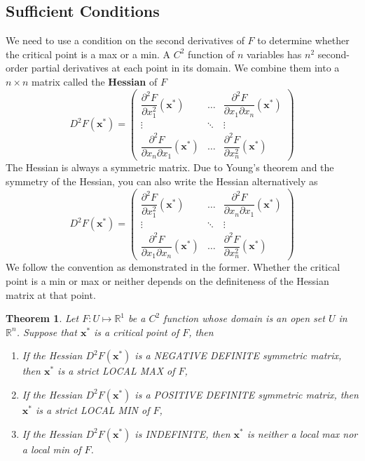 \documentclass[10pt,a4paper]{book}
\newtheorem{theorem}{Theorem}[section]
\theoremstyle{definition}\newtheorem{definition}{Definition}
\theoremstyle{definition}\newtheorem{fact}{Fact}
\theoremstyle{definition}\newtheorem{ex}{Ex.}
\theoremstyle{definition}\newtheorem{project}{Project}
\theoremstyle{definition}\newtheorem{problem}{Problem}
\theoremstyle{definition}\newtheorem{example}{Example}
\numberwithin{theorem}{chapter}
\numberwithin{corollary}{chapter}
\numberwithin{assumption}{chapter}
\numberwithin{definition}{chapter}
\numberwithin{prop}{chapter}
\numberwithin{notation}{chapter}
\numberwithin{problem}{chapter}
\numberwithin{example}{chapter}
\numberwithin{fact}{chapter}
\numberwithin{ex}{chapter}
\newenvironment{ftheorem}
{\begin{mdframed}\begin{theorem}}
		{\end{theorem}\end{mdframed}}
\def\R{\mathbb R}
\def\R{\mathbb R}
\def\x{\mathbf x}
\begin{document}
	\subsection{Sufficient Conditions}
	We need to use a condition on the second derivatives of $F$ to determine whether the critical point is a max or a min. A $C^2$ function of $n$ variables has $n^2$ second-order partial derivatives at each point in its domain. We combine them into a $n\times n$ matrix called the \textbf{Hessian} of $F$
	\begin{equation*}
		D^2 F(\x^*) = 
		\begin{pmatrix}
			\dfrac{\partial^2 F}{\partial x_1^2} (\x^*)            & \dots  & \dfrac{\partial^2 F}{\partial x_1 \partial x_n} (\x^*) \\
			\vdots                                                 & \ddots & \vdots                                                 \\
			\dfrac{\partial^2 F}{\partial x_n \partial x_1} (\x^*) & \dots  & \dfrac{\partial^2 F}{\partial x_n^2} (\x^*)            
		\end{pmatrix}
	\end{equation*}
	The Hessian is always a symmetric matrix. Due to Young's theorem and the symmetry of the Hessian, you can also write the Hessian alternatively as
	\begin{equation*}
		D^2 F(\x^*) = 
		\begin{pmatrix}
			\dfrac{\partial^2 F}{\partial x_1^2} (\x^*)            & \dots  & \dfrac{\partial^2 F}{\partial x_n \partial x_1} (\x^*) \\
			\vdots                                                 & \ddots & \vdots                                                 \\
			\dfrac{\partial^2 F}{\partial x_1 \partial x_n} (\x^*) & \dots  & \dfrac{\partial^2 F}{\partial x_n^2} (\x^*)            
		\end{pmatrix}
	\end{equation*}
	We follow the convention as demonstrated in the former. Whether the critical point is a min or max or neither depends on the definiteness of the Hessian matrix at that point.
	
	\begin{ftheorem}
		Let $F: U \mapsto \R^1$ be a $C^2$ function whose domain is an open set $U$ in $\R^n$. Suppose that $\x^*$ is a critical point of $F$, then
		\begin{enumerate}
			\item If the Hessian $D^2 F(\x^*)$ is a NEGATIVE DEFINITE symmetric matrix, then $\x^*$ is a strict LOCAL MAX of $F$,
			\item If the Hessian $D^2 F(\x^*)$ is a POSITIVE DEFINITE symmetric matrix, then $\x^*$ is a strict LOCAL MIN of $F$,
			\item If the Hessian $D^2 F(\x^*)$ is INDEFINITE, then $\x^*$ is neither a local max nor a local min of $F$.
		\end{enumerate}
	\end{ftheorem}
	
\end{document}
